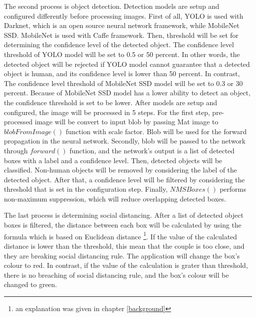         The second process is object detection.
        Detection models are setup and configured differently before processing images.
        First of all, YOLO is used with Darknet, which is an open source neural network framework,
            while MobileNet SSD. MobileNet is used with Caffe framework.
        Then, threshold will be set for determining the confidence level of the detected object.
            The confidence level threshold of YOLO model will be set to 0.5 or 50 percent.
            In other words, the detected object will be rejected if YOLO model cannot guarantee that a detected object is human,
            and its confidence level is lower than 50 percent.
            In contrast, The confidence level threshold of MobileNet SSD model will be set to 0.3 or 30 percent.
            Because of MobileNet SSD model has a lower ability to detect an object, the confidence threshold is set to be lower.
        After models are setup and configured, the image will be processed in 5 steps.
        For the first step, pre-processed image will be convert to input blob by passing Mat image to $blobFromImage()$ function with scale factor.
            Blob will be used for the forward propagation in the neural network.
        Secondly, blob will be passed to the network through $forward()$ function,
            and the network's output is a list of detected boxes with a label and a confidence level.
        Then, detected objects will be classified.
            Non-human objects will be removed by considering the label of the detected object.
        After that, a confidence level will be filtered by considering the threshold that is set in the configuration step.
        Finally, $NMSBoxes()$ performs non-maximum suppression, which will reduce overlapping detected boxes.

        The last process is determining social distancing.
        After a list of detected object boxes is filtered,
        the distance between each box will be calculated by using the formula which is based on Euclidean distance
        \footnote{an explanation was given in chapter \ref{background}}.
        If the value of the calculated distance is lower than the threshold,
        this mean that the couple is too close, and they are breaking social distancing rule.
        The application will change the box's colour to red.
        In contrast, if the value of the calculation is grater than threshold,
        there is no breaching of social distancing rule, and the box's colour will be changed to green.

